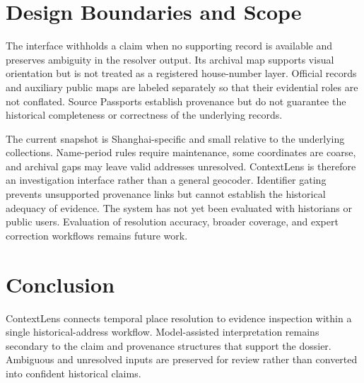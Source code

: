 \documentclass[letterpaper]{article} %
\begin{document}


\section{Design Boundaries and Scope}
The interface withholds a claim when no supporting record is available and preserves ambiguity in the resolver output. Its archival map supports visual orientation but is not treated as a registered house-number layer. Official records and auxiliary public maps are labeled separately so that their evidential roles are not conflated. Source Passports establish provenance but do not guarantee the historical completeness or correctness of the underlying records.

The current snapshot is Shanghai-specific and small relative to the underlying collections. Name-period rules require maintenance, some coordinates are coarse, and archival gaps may leave valid addresses unresolved. ContextLens is therefore an investigation interface rather than a general geocoder. Identifier gating prevents unsupported provenance links but cannot establish the historical adequacy of evidence. The system has not yet been evaluated with historians or public users. Evaluation of resolution accuracy, broader coverage, and expert correction workflows remains future work.

\section{Conclusion}
ContextLens connects temporal place resolution to evidence inspection within a single historical-address workflow. Model-assisted interpretation remains secondary to the claim and provenance structures that support the dossier. Ambiguous and unresolved inputs are preserved for review rather than converted into confident historical claims.



\clearpage

\end{document}
